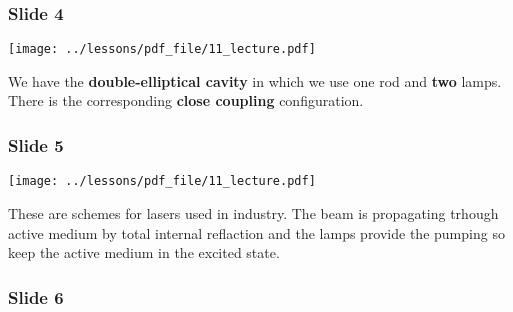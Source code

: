 \documentclass[../main/main.tex]{subfiles}
\begin{document}
\newpage

\subsubsection*{Slide 4}

\begin{minipage}[]{0.5\linewidth}
\centering
\texttt{[image: ../lessons/pdf\_file/11\_lecture.pdf]}
\end{minipage}
\hspace{0.3cm}\vspace{0.3cm}
\begin{minipage}[c]{0.47\linewidth}

We have the \textbf{double-elliptical cavity} in which we use one rod and \textbf{two} lamps. There is the corresponding \textbf{close coupling} configuration.

\end{minipage}

\subsubsection*{Slide 5}

\begin{minipage}[]{0.5\linewidth}
\centering
\texttt{[image: ../lessons/pdf\_file/11\_lecture.pdf]}
\end{minipage}
\hspace{0.3cm}\vspace{0.3cm}
\begin{minipage}[c]{0.47\linewidth}

These are schemes for lasers used in industry. The beam is propagating trhough active medium by total internal reflaction and the lamps provide the pumping so keep the active medium in the excited state.

\end{minipage}

\subsubsection*{Slide 6}
\end{document}
